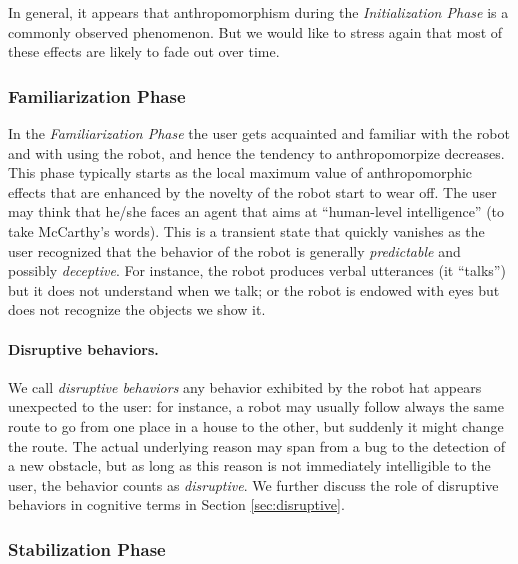 \documentclass{frontiersSCNS} %
\begin{document}
In general, it appears that anthropomorphism during the \textit{Initialization
Phase} is a commonly observed phenomenon. But we would like to stress again that
most of these effects are likely to fade out over time.

\subsubsection{Familiarization Phase\\}

In the \textit{Familiarization Phase} the user gets acquainted and familiar with
the robot and with using the robot, and hence the tendency to anthropomorpize
decreases. This phase typically starts as the local maximum value of
anthropomorphic effects that are enhanced by the novelty of the robot start to
wear off. The user may think that he/she faces an agent that aims at
``human-level intelligence'' (to take McCarthy's words). This is a transient
state that quickly vanishes as the user recognized that the behavior of the
robot is generally \textit{predictable} and possibly \textit{deceptive}. For
instance, the robot produces verbal utterances (it ``talks'') but it does not
understand when we talk; or the robot is endowed with eyes but does not
recognize the objects we show it.

\paragraph{Disruptive behaviors.}

We call \emph{disruptive behaviors} any behavior exhibited by the robot hat
appears unexpected to the user: for instance, a robot may usually follow always
the same route to go from one place in a house to the other, but suddenly it
might change the route. The actual underlying reason may span from a bug to the
detection of a new obstacle, but as long as this reason is not immediately
intelligible to the user, the behavior counts as \emph{disruptive}. We further
discuss the role of disruptive behaviors in cognitive terms in Section
\ref{sec:disruptive}.


\subsubsection{Stabilization Phase\\}
\end{document}
